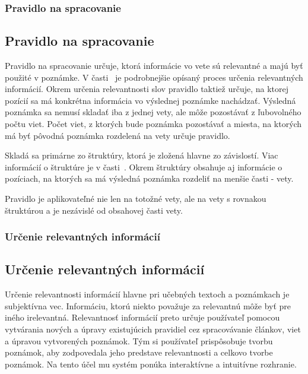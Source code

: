 %
%
{
	\subsubsection{Pravidlo na spracovanie}
}
{
	\subsection{Pravidlo na spracovanie}
}
\label{subsubsection:rule_for_processing}
Pravidlo na spracovanie určuje, ktorá informácie vo vete sú relevantné a majú byť použité v poznámke. V časti~ je podrobnejšie opísaný proces určenia relevantných informácií. Okrem určenia relevantnosti slov pravidlo taktiež určuje, na ktorej pozícií sa má konkrétna informácia vo výslednej poznámke nachádzať. Výsledná poznámka sa nemusí skladať iba z jednej vety, ale môže pozostávať z ľubovolného počtu viet. Počet viet, z ktorých bude poznámka pozostávať a miesta, na ktorých má byť pôvodná poznámka rozdelená na vety určuje pravidlo.

Skladá sa primárne zo štruktúry, ktorá je zložená hlavne zo závislostí. Viac informácií o štruktúre je v časti~. Okrem štruktúry obsahuje aj informácie o pozíciach, na ktorých sa má výsledná poznámka rozdeliť na menšie časti - vety.

Pravidlo je aplikovateľné nie len na totožné vety, ale na vety s rovnakou štruktúrou a je nezávislé od obsahovej časti vety.

%
%
{
	\subsubsection{Určenie relevantných informácií}
}
{
	\subsection{Určenie relevantných informácií}
}
\label{subsubsection:determination_of_relevant_information}
Určenie relevantnosti informácií hlavne pri učebných textoch a poznámkach je subjektívna vec. Informáciu, ktorú niekto považuje za relevantnú môže byť pre iného irelevantná. Relevantnosť informácií preto určuje používateľ pomocou vytvárania nových a úpravy existujúcich pravidiel cez spracovávanie článkov, viet a úpravou vytvorených poznámok. Tým si používateľ prispôsobuje tvorbu poznámok, aby zodpovedala jeho predstave relevantnosti a celkovo tvorbe poznámok. Na tento účel mu systém ponúka interaktívne a intuitívne rozhranie.

